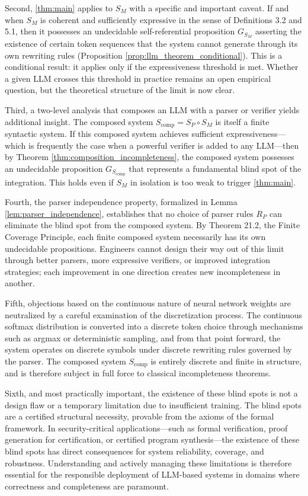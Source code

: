 \documentclass[11pt]{article}
\begin{document}
Second, \ref{thm:main} applies to $S_M$ with a specific and important caveat. If and when $S_M$ is coherent and sufficiently expressive in the sense of Definitions 3.2 and 5.1, then it possesses an undecidable self-referential proposition $G_{S_M}$ asserting the existence of certain token sequences that the system cannot generate through its own rewriting rules (Proposition \ref{prop:llm_theorem_conditional}). This is a conditional result: it applies only if the expressiveness threshold is met. Whether a given LLM crosses this threshold in practice remains an open empirical question, but the theoretical structure of the limit is now clear.

Third, a two-level analysis that composes an LLM with a parser or verifier yields additional insight. The composed system $S_{\text{comp}} = S_P \circ S_M$ is itself a finite syntactic system. If this composed system achieves sufficient expressiveness—which is frequently the case when a powerful verifier is added to any LLM—then by Theorem \ref{thm:composition_incompleteness}, the composed system possesses an undecidable proposition $G_{S_{\text{comp}}}$ that represents a fundamental blind spot of the integration. This holds even if $S_M$ in isolation is too weak to trigger \ref{thm:main}.

Fourth, the parser independence property, formalized in Lemma \ref{lem:parser_independence}, establishes that no choice of parser rules $R_P$ can eliminate the blind spot from the composed system. By Theorem 21.2, the Finite Coverage Principle, each finite composed system necessarily has its own undecidable propositions. Engineers cannot design their way out of this limit through better parsers, more expressive verifiers, or improved integration strategies; each improvement in one direction creates new incompleteness in another.

Fifth, objections based on the continuous nature of neural network weights are neutralized by a careful examination of the discretization process. The continuous softmax distribution is converted into a discrete token choice through mechanisms such as argmax or deterministic sampling, and from that point forward, the system operates on discrete symbols under discrete rewriting rules governed by the parser. The composed system $S_{\text{comp}}$ is entirely discrete and finite in structure, and is therefore subject in full force to classical incompleteness theorems.

Sixth, and most practically important, the existence of these blind spots is not a design flaw or a temporary limitation due to insufficient training. The blind spots are a certified structural necessity, provable from the axioms of the formal framework. In security-critical applications—such as formal verification, proof generation for certification, or certified program synthesis—the existence of these blind spots has direct consequences for system reliability, coverage, and robustness. Understanding and actively managing these limitations is therefore essential for the responsible deployment of LLM-based systems in domains where correctness and completeness are paramount.
\end{document}
